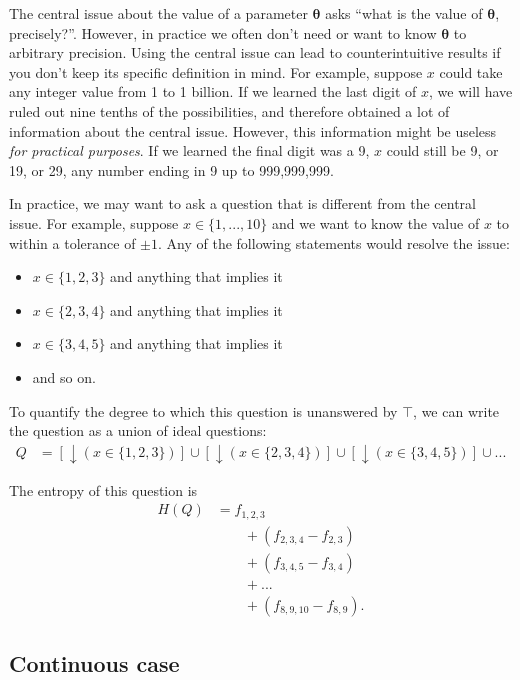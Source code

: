 \documentclass[entropy,article,accept,oneauthor,pdftex,10pt,a4paper]{mdpi}
\newcommand{\x}{\boldsymbol{\theta}}
\begin{document}
The central issue about the value of a parameter $\x$ asks
``what is the value of $\x$, precisely?''. However, in practice we often
don't need or want to know $\x$ to arbitrary precision. Using the central
issue can lead to counterintuitive results if you don't keep its specific
definition in mind. For example, suppose $x$ could take any integer value
from 1 to 1 billion. If we learned the last digit of $x$, we
will have ruled out nine tenths of the possibilities, and therefore obtained
a lot of information about the central issue. However,
this information might be useless {\em for practical purposes}.
If we learned the final
digit was a 9, $x$ could still be 9, or 19, or 29, any number ending in 9
up to 999,999,999.

In practice, we may
want to ask a question that is different from the central issue.
For example, suppose $x \in \{1, ..., 10\}$ and
we want to know the value of $x$ to within a tolerance
of $\pm 1$. Any of the following statements would resolve the issue:
\begin{itemize}
\item $x \in \{1, 2, 3\}$ and anything that implies it
\item $x \in \{2, 3, 4\}$ and anything that implies it
\item $x \in \{3, 4, 5\}$ and anything that implies it
\item and so on.
\end{itemize}
To quantify the degree to which this question is unanswered by
$\top$, we can write the question as a union of ideal questions:
\begin{align}
Q &= \left[\downarrow (x \in \{1, 2, 3\})\right] \cup
     \left[\downarrow (x \in \{2, 3, 4\})\right] \cup
     \left[\downarrow (x \in \{3, 4, 5\})\right] \cup ...
\end{align}

The entropy of this question is
\begin{align}
H(Q) &= f_{1,2,3}\\
     & \quad \quad + \left(f_{2,3,4} - f_{2,3}\right) \\
     & \quad \quad + \left(f_{3,4,5} - f_{3,4}\right) \\
     & \quad \quad + ... \\
     & \quad \quad + \left(f_{8,9,10} - f_{8,9}\right).
\end{align}


\subsection*{Continuous case}
\end{document}

